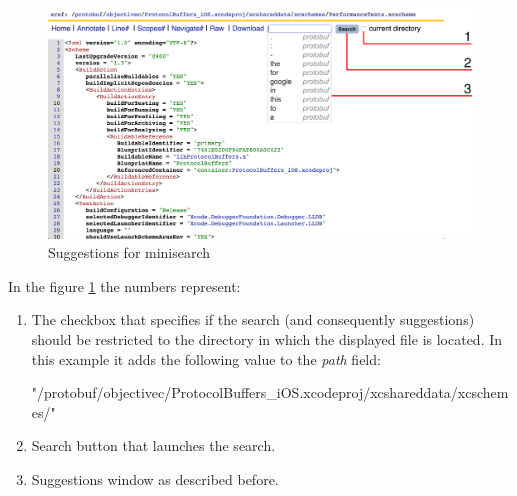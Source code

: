 \begin{figure}[htbp]
    \centering
    \includegraphics[width=145mm]{../img/minisearch.png}
    \caption{Suggestions for minisearch}
    \label{suggestions_minisearch}
\end{figure}

In the figure \ref{suggestions_minisearch} the numbers represent:
\begin{enumerate}
    \item The checkbox that specifies if the search (and consequently suggestions) should be restricted to the directory
    in which the displayed file is located. In this example it adds the following value to the \textit{path} field:
\begin{code}
"/protobuf/objectivec/ProtocolBuffers_iOS.xcodeproj/xcshareddata/xcschemes/"
\end{code}
    \item Search button that launches the search.
    \item Suggestions window as described before.
\end{enumerate}

